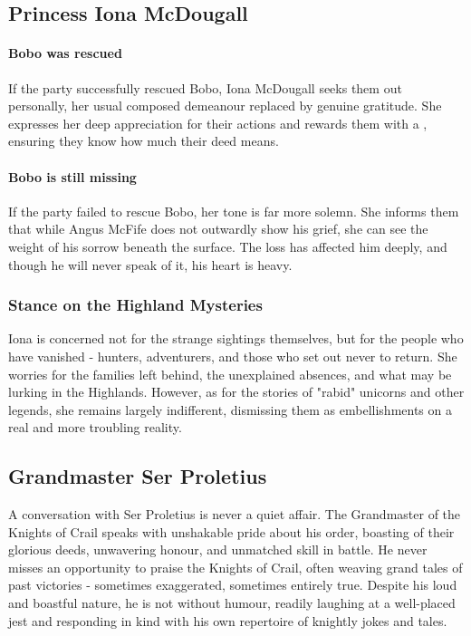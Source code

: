 \subsection*{Princess Iona McDougall}
{\entryfont \paragraph*{Bobo was rescued} If the party successfully rescued Bobo, Iona McDougall seeks them out personally, her usual composed demeanour replaced by genuine gratitude. She expresses her deep appreciation for their actions and rewards them with a \hyperref[mi:HeartPureOfSteel]{}, ensuring they know how much their deed means.}
{\entryfont \paragraph*{Bobo is still missing}
If the party failed to rescue Bobo, her tone is far more solemn. She informs them that while Angus McFife does not outwardly show his grief, she can see the weight of his sorrow beneath the surface. The loss has affected him deeply, and though he will never speak of it, his heart is heavy.}
\subsubsection*{Stance on the Highland Mysteries}
{\entryfont Iona is concerned not for the strange sightings themselves, but for the people who have vanished - hunters, adventurers, and those who set out never to return. She worries for the families left behind, the unexplained absences, and what may be lurking in the Highlands. However, as for the stories of "rabid" unicorns and other legends, she remains largely indifferent, dismissing them as embellishments on a real and more troubling reality.}
\subsection*{Grandmaster Ser Proletius}
{\entryfont A conversation with Ser Proletius is never a quiet affair. The Grandmaster of the Knights of Crail speaks with unshakable pride about his order, boasting of their glorious deeds, unwavering honour, and unmatched skill in battle. He never misses an opportunity to praise the Knights of Crail, often weaving grand tales of past victories - sometimes exaggerated, sometimes entirely true. Despite his loud and boastful nature, he is not without humour, readily laughing at a well-placed jest and responding in kind with his own repertoire of knightly jokes and tales.}
